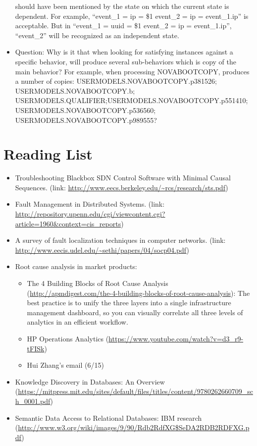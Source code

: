 \documentclass{article}
\begin{document}
\begin{itemize}
  should have been mentioned by the state on which the current state is
  dependent. For example, ``event\_1 = {ip = \$1} event\_2 = {ip =
    event\_1.ip}'' is acceptable. But in ``event\_1 = {uuid = \$1} event\_2 = {ip =
    event\_1.ip}'', ``event\_2'' will be recognized as an independent state.
\item Question: Why is it that when looking for satisfying instances against a
  specific behavior, \saf{} will produce several sub-behaviors which is copy of
  the main behavior? For example, when processing NOVABOOTCOPY, \saf{} produces
  a number of copies: USERMODELS.NOVABOOTCOPY.p381526;
  USERMODELS.NOVABOOTCOPY.b;
  USERMODELS.QUALIFIER;USERMODELS.NOVABOOTCOPY.p551410;
  USERMODELS.NOVABOOTCOPY.p536560; USERMODELS.NOVABOOTCOPY.p989555?

\end{itemize}

\section{Reading List}
\label{sec:read}

\begin{itemize}

\item Troubleshooting Blackbox SDN Control Software with Minimal Causal
Sequences. (link: \url{http://www.eecs.berkeley.edu/~rcs/research/sts.pdf})

\item Fault Management in Distributed Systems. (link:
\url{http://repository.upenn.edu/cgi/viewcontent.cgi?article=1960&context=cis_reports}) 

\item A survey of fault localization techniques in computer networks. (link:
  \url{http://www.eecis.udel.edu/~sethi/papers/04/socp04.pdf})

\item Root cause analysis in market products:

  \begin{itemize}
  \item The 4 Building Blocks of Root Cause Analysis
    (\url{http://apmdigest.com/the-4-building-blocks-of-root-cause-analysis}): The
    best practice is to unify the three layers into a single infrastructure
    management dashboard, so you can visually correlate all three levels of
    analytics in an efficient workflow.
  \item HP Operations Analytics (\url{https://www.youtube.com/watch?v=d3_r9-tFISk})
  \item Hui Zhang's email (6/15)
  \end{itemize}

\item Knowledge Discovery in Databases: An Overview 
(\url{https://mitpress.mit.edu/sites/default/files/titles/content/9780262660709_sch_0001.pdf})

\item Semantic Data Access to Relational Databases: IBM research
(\url{http://www.w3.org/wiki/images/9/90/Rdb2RdfXG$SeDA2RDB2RDFXG.pdf})

\end{itemize}
\end{document}
